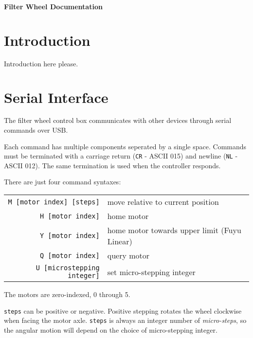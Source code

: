 \documentclass[11pt]{article}
\begin{document}
	
\begin{flushleft}
	{\Huge \textbf{Filter Wheel Documentation}}
\end{flushleft}

{\let\newpage\relax\begin{spacing}{0.1}\tableofcontents\end{spacing}}
\pagebreak
	
\section{Introduction}\label{sec:introduction}

Introduction here please.

\pagebreak
\section{Serial Interface}

The filter wheel control box communicates with other devices through serial commands over USB.

Each command has multiple components seperated by a single space. Commands must be terminated with a carriage return (\texttt{CR} - ASCII 015) and newline (\texttt{NL} - ASCII 012). The same termination is used when the controller responds.

There are just four command syntaxes:

\begin{center}
	\begin{tabular}{r | l}
		\texttt{M [motor index] [steps]} & move relative to current position \\ 
		\texttt{H [motor index]} & home motor \\
		\texttt{Y [motor index]} & home motor towards upper limit (Fuyu Linear) \\
		\texttt{Q [motor index]} & query motor \\
		\texttt{U [microstepping integer]} & set micro-stepping integer
	\end{tabular}
\end{center}

The motors are zero-indexed, 0 through 5.

\texttt{steps} can be positive or negative. Positive stepping rotates the wheel clockwise when facing the motor axle. \texttt{steps} is always an integer number of \textit{micro-steps}, so the angular motion will depend on the choice of micro-stepping integer.
\end{document}
